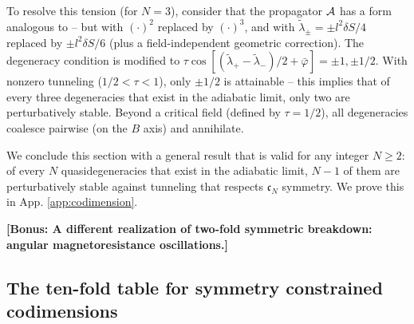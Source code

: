 \documentclass[aps, prb, showpacs, twocolumn, notitlepage, superscriptaddress]{revtex4-1}
\begin{document}
To resolve this tension (for $N{=}3$), consider that the propagator ${\cal A}$ has a form analogous to  -- but with $(\cdot)^2$ replaced by $(\cdot)^3$, and with $\tilde{\lambda}_\pm{=}{\pm} l^2\delta S/4$ replaced by $\pm l^2\delta S/6$ (plus a field-independent geometric correction). The degeneracy condition is modified to $\tau\cos[(\tilde{\lambda}_+{-}\tilde{\lambda}_-)/2{+}\bar{\varphi}]{=}{\pm} 1,{\pm} 1/2$. With nonzero tunneling ($1/2{<}\tau {<}1$), only $\pm 1/2$ is attainable -- this implies that of every three degeneracies that exist in the adiabatic limit, only two are perturbatively stable. Beyond a critical field  (defined by $\tau{=}1/2$), all degeneracies coalesce pairwise (on the $B$ axis) and annihilate. 

We conclude this section with a general result that is valid for any integer $N{\geq}2$: of every $N$ quasidegeneracies that exist in the adiabatic limit, $N{-}1$ of them are perturbatively stable against tunneling that respects  $\mathfrak{c}_N$ symmetry. We prove this in App. \ref{app:codimension}.

\textbf{[Bonus: A different realization of two-fold symmetric breakdown: angular magnetoresistance oscillations.]}

\subsection{The ten-fold table for symmetry constrained codimensions}\label{sec:tenfold}
\end{document}
